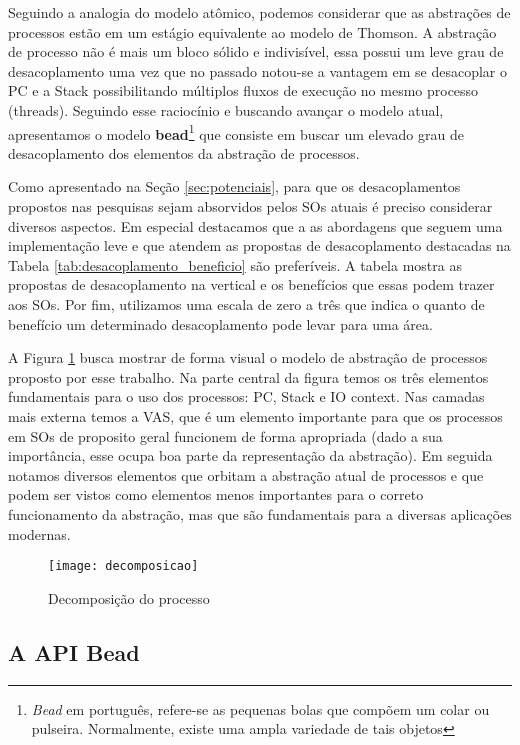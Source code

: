 Seguindo a analogia do modelo atômico, podemos considerar que as abstrações de
processos estão em um estágio equivalente ao modelo de Thomson. A abstração de
processo não é mais um bloco sólido e indivisível, essa possui um leve grau de
desacoplamento uma vez que no passado notou-se a vantagem em se desacoplar o PC
e a Stack possibilitando múltiplos fluxos de execução no mesmo processo
(threads). Seguindo esse raciocínio e buscando avançar o modelo atual,
apresentamos o modelo \textbf{bead}\footnote{\emph{Bead} em português,
refere-se as pequenas bolas que compõem um colar ou pulseira. Normalmente,
existe uma ampla variedade de tais objetos} que consiste em buscar um elevado
grau de desacoplamento dos elementos da abstração de processos.

Como apresentado na Seção \ref{sec:potenciais}, para que os desacoplamentos
propostos nas pesquisas sejam absorvidos pelos SOs atuais é preciso considerar
diversos aspectos. Em especial destacamos que a as abordagens que seguem uma
implementação leve e que atendem as propostas de desacoplamento destacadas na
Tabela \ref{tab:desacoplamento_beneficio} são preferíveis. A tabela mostra as
propostas de desacoplamento na vertical e os benefícios que essas podem trazer
aos SOs. Por fim, utilizamos uma escala de zero a três  que indica o
quanto de benefício um determinado desacoplamento pode levar para uma área.



A Figura \ref{fig:decomposicao_proc} busca mostrar de forma visual o modelo de
abstração de processos proposto por esse trabalho. Na parte central da figura
temos os três elementos fundamentais para o uso dos processos: PC, Stack e IO
context. Nas camadas mais externa temos a VAS, que é um elemento importante
para que os processos em SOs de proposito geral funcionem de forma apropriada
(dado a sua importância, esse ocupa boa parte da representação da abstração).
Em seguida notamos diversos elementos que orbitam a abstração atual de
processos e que podem ser vistos como elementos menos importantes para o
correto funcionamento da abstração, mas que são fundamentais para a diversas
aplicações modernas.

\begin{figure}[!h]
  \centering
  \texttt{[image: decomposicao]}
  \caption{Decomposição do processo}
  \label{fig:decomposicao_proc}
\end{figure}

\subsection{A API Bead}
\label{sec:api}

